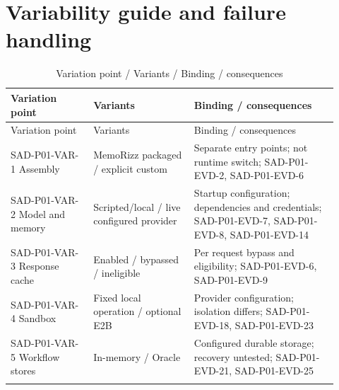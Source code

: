 \documentclass[10pt,letterpaper]{article}
\begin{document}
\section{Variability guide and failure handling}
\begin{longtable}{@{}>{\raggedright\arraybackslash}p{0.23\linewidth}>{\raggedright\arraybackslash}p{0.29\linewidth}>{\raggedright\arraybackslash}p{0.4\linewidth}@{}}
\caption{Variation point / Variants / Binding / consequences}\\
\toprule Variation point & Variants & Binding / consequences\\\midrule\endfirsthead
\toprule Variation point & Variants & Binding / consequences\\\midrule\endhead
SAD-P01-VAR-1 Assembly & MemoRizz packaged / explicit custom & Separate entry points; not runtime switch; SAD-P01-EVD-2, SAD-P01-EVD-6\\\addlinespace
SAD-P01-VAR-2 Model and memory & Scripted/local / live configured provider & Startup configuration; dependencies and credentials; SAD-P01-EVD-7, SAD-P01-EVD-8, SAD-P01-EVD-14\\\addlinespace
SAD-P01-VAR-3 Response cache & Enabled / bypassed / ineligible & Per request bypass and eligibility; SAD-P01-EVD-6, SAD-P01-EVD-9\\\addlinespace
SAD-P01-VAR-4 Sandbox & Fixed local operation / optional E2B & Provider configuration; isolation differs; SAD-P01-EVD-18, SAD-P01-EVD-23\\\addlinespace
SAD-P01-VAR-5 Workflow stores & In-memory / Oracle & Configured durable storage; recovery untested; SAD-P01-EVD-21, SAD-P01-EVD-25\\\addlinespace
\bottomrule\end{longtable}
\end{document}
